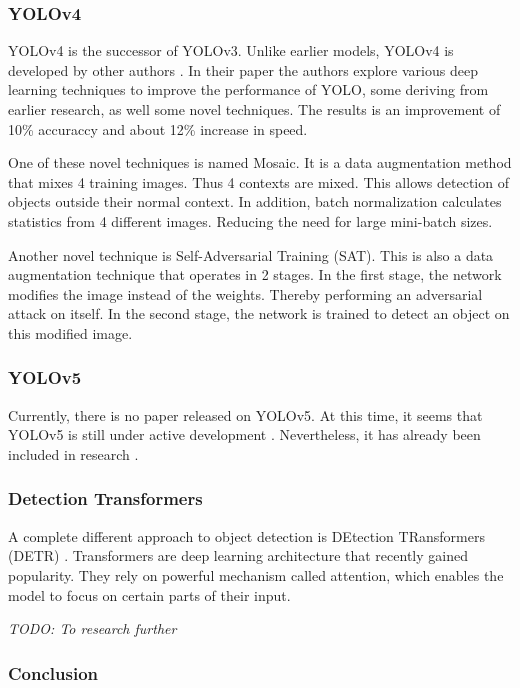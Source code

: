 \subsubsection{YOLOv4}

YOLOv4 is the successor of YOLOv3. Unlike earlier models, YOLOv4 is developed by other authors \cite{Bochkovskiy2020}. In their paper the authors explore various deep learning techniques to improve the performance of YOLO, some deriving from earlier research, as well some novel techniques. The results is an improvement of 10\% accuraccy and about 12\% increase in speed.

One of these novel techniques is named Mosaic. It is a data augmentation method that mixes 4 training images. Thus 4 contexts are mixed. This allows detection of objects outside their normal context. In addition, batch normalization calculates statistics from 4 different images. Reducing the need for large mini-batch sizes.

Another novel technique is Self-Adversarial Training (SAT). This is also a data augmentation technique that operates in 2 stages. In the first stage, the network modifies the image instead of the weights. Thereby performing an adversarial attack on itself. In the second stage, the network is trained to detect an object on this modified image.


\subsubsection{YOLOv5}

Currently, there is no paper released on YOLOv5. At this time, it seems that YOLOv5 is still under active development \cite{Jocher2021}. Nevertheless, it has already been included in research \cite{Arya2020-competition}.


\subsubsection{Detection Transformers}

A complete different approach to object detection is DEtection TRansformers (DETR) \cite{Carion2020}. Transformers are deep learning architecture that recently gained popularity. They rely on powerful mechanism called attention, which enables the model to focus on certain parts of their input. 

\textit{TODO: To research further}


\subsubsection{Conclusion}



